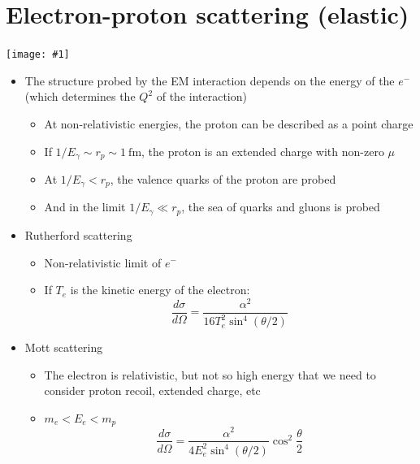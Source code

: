 \documentclass[11pt]{article}
\newcommand{\dd}[2]{\dfrac{d #1}{d #2}}
\newcommand{\fm}{\text{fm}}
\newcommand{\el}{\ensuremath{e^{-}}}
\newcommand{\embedimgw}[2]{\begin{center}\texttt{[image: \#1]}\end{center}}
\begin{document}
\section{Electron-proton scattering (elastic)}
\embedimgw{figs/epranges.png}{.5}
\begin{itemize}
  \item The structure probed by the EM interaction depends on the energy of the \el (which determines the $Q^2$ of the interaction)
  \begin{itemize}
    \item At non-relativistic energies, the proton can be described as a point charge
    \item If $1/E_\gamma \sim r_p \sim 1~\fm$, the proton is an extended charge with non-zero $\mu$
    \item At $1/E_\gamma < r_p$, the valence quarks of the proton are probed
    \item And in the limit $1/E_\gamma \ll r_p$, the sea of quarks and gluons is probed
  \end{itemize}
  \item Rutherford scattering
  \begin{itemize}
    \item Non-relativistic limit of \el
    \item If $T_e$ is the kinetic energy of the electron:
    \begin{equation}
      \dd\sigma\Omega = \dfrac{\alpha^2}{16 T_e^2\sin^4(\theta/2)}
    \end{equation}
  \end{itemize}
  \item Mott scattering
  \begin{itemize}
    \item The electron is relativistic, but not so high energy that we need to consider proton recoil, extended charge, etc
    \item $m_e < E_e < m_p$
    \begin{equation}
      \dd\sigma\Omega = \dfrac{\alpha^2}{4E_e^2\sin^4(\theta/2)}\cos^2\frac\theta 2
    \end{equation}
  \end{itemize}
\end{itemize}
\end{document}
